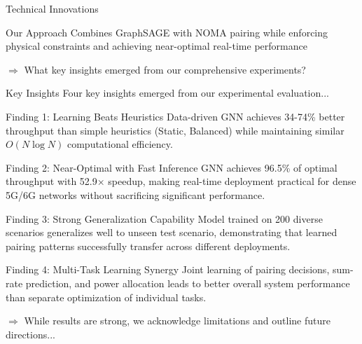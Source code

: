 \documentclass[aspectratio=169]{beamer}
\begin{document}
\begin{frame}{Technical Innovations}
  
    
    \begin{exampleblock}{Our Approach}
         Combines GraphSAGE with NOMA pairing while enforcing physical constraints and achieving near-optimal real-time performance
    \end{exampleblock}
    
    \vspace{0.2cm}
    \small \textcolor{iiitblue}{$\Rightarrow$ What key insights emerged from our comprehensive experiments?}
\end{frame}

\begin{frame}{Key Insights}
    \vspace{-0.2cm}
    \small \textcolor{iiitblue}{Four key insights emerged from our experimental evaluation...}
    
    \begin{block}{Finding 1: Learning Beats Heuristics}
        Data-driven GNN achieves 34-74\% better throughput than simple heuristics (Static, Balanced) while maintaining similar $O(N \log N)$ computational efficiency.
    \end{block}
    
    \begin{block}{Finding 2: Near-Optimal with Fast Inference}
        GNN achieves 96.5\% of optimal throughput with 52.9× speedup, making real-time deployment practical for dense 5G/6G networks without sacrificing significant performance.
    \end{block}
    
    \begin{block}{Finding 3: Strong Generalization Capability}
        Model trained on 200 diverse scenarios generalizes well to unseen test scenario, demonstrating that learned pairing patterns successfully transfer across different deployments.
    \end{block}
    
    \begin{block}{Finding 4: Multi-Task Learning Synergy}
        Joint learning of pairing decisions, sum-rate prediction, and power allocation leads to better overall system performance than separate optimization of individual tasks.
    \end{block}
    
    \vspace{0.2cm}
    \small \textcolor{iiitblue}{$\Rightarrow$ While results are strong, we acknowledge limitations and outline future directions...}
\end{frame}
\end{document}
